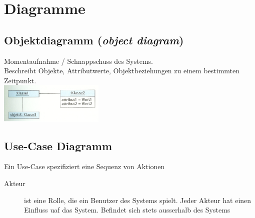 \section{Diagramme}

\subsection{Objektdiagramm (\textit{object diagram})}
	\begin{multicols}{2}
		Momentaufnahme / Schnappschuss des Systems. \\
		Beschreibt Objekte, Attributwerte, Objektbeziehungen zu einem bestimmten Zeitpunkt. \\
	\columnbreak
		\includegraphics[width=5cm]{./images/objektdiagramm.png}
	\end{multicols}

\subsection{Use-Case Diagramm}
	Ein Use-Case spezifiziert eine Sequenz von Aktionen
	\begin{description}
		\item[Akteur] ist eine Rolle, die ein Benutzer des Systems spielt. Jeder
		Akteur hat einen Einfluss uaf das System. Befindet sich stets ausserhalb des Systems\\
	\end{description}